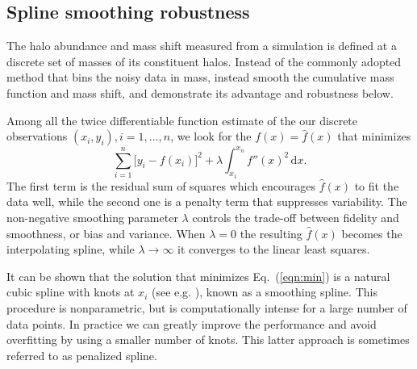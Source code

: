\documentclass[prd,twocolumn,amsmath,amssymb,floatfix,superscriptaddress]{revtex4-1}
\newcommand{\dr}{\mathrm{d}}
\begin{document}
\subsection{Spline smoothing robustness}
\label{sub:spline}

The halo abundance and mass shift measured from a simulation is
defined at a discrete set of masses of its constituent halos.
Instead of the commonly adopted method that bins the noisy data in mass,
instead smooth the cumulative mass function and mass shift,
and demonstrate its advantage and robustness below.

Among all the twice differentiable function estimate
of the our discrete observations $(x_i, y_i), i = 1, \ldots, n$,
we look for the $f(x)=\hat f(x)$ that minimizes
\begin{equation}
    \sum_{i=1}^n \big[ y_i - f(x_i)\big]^2
    + \lambda\int_{x_1}^{x_n}\! f''\!(x)^2 \,\dr x.
    \label{eqn:min}
\end{equation}
The first term is the residual sum of squares which encourages
$\hat f(x)$ to fit the data well, while the second one is a penalty term that
suppresses variability.
The non-negative smoothing parameter $\lambda$ controls the trade-off between
fidelity and smoothness, or bias and variance.
When $\lambda=0$ the resulting $\hat f(x)$ becomes
the interpolating spline, while $\lambda\to\infty$ it converges to the linear least squares.

It can be shown that the solution that minimizes Eq.~(\ref{eqn:min})
is a natural cubic spline with knots at $x_i$ (see e.g. \cite{JamesWittenEtAl13}),
known as a smoothing spline.
This procedure is nonparametric,
but is computationally intense for a large number of data points.
In practice we can greatly improve the performance and avoid overfitting
by using a smaller number of knots.
This latter approach is sometimes referred to as penalized spline.
\end{document}
